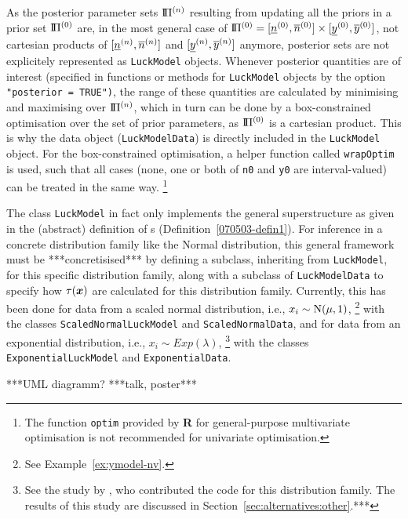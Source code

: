 As the posterior parameter sets $\text{I}\!\Pi^{(n)}$ resulting from updating all the priors in a
prior set $\text{I}\!\Pi^{(0)}$ are, in the most general case of $\text{I}\!\Pi^{(0)} = [\underline{n}^{(0)},\overline{n}^{(0)}] \times [\underline{y}^{(0)}, \overline{y}^{(0)}]$,
not cartesian products of $[\underline{n}^{(n)}, \overline{n}^{(n)}]$ and $[\underline{y}^{(n)}, \overline{y}^{(n)}]$ anymore, posterior sets are not
explicitely represented as \texttt{LuckModel} objects. Whenever posterior quantities
are of interest (specified in functions or methods for \texttt{LuckModel} objects by the option \texttt{"posterior = TRUE")},
the range of these quantities are calculated by minimising and maximising over $\text{I}\!\Pi^{(n)}$, %
which in turn can be done by a box-constrained optimisation over the set of prior parameters,
as $\text{I}\!\Pi^{(0)}$ is a cartesian product.
This is why the data object (\texttt{LuckModelData}) is directly included in the \texttt{LuckModel} object.
For the box-constrained optimisation, a helper function called \texttt{wrapOptim} is used,
such that all cases (none, one or both of \texttt{n0} and \texttt{y0} %
are interval-valued) can be treated in the same way.%
\footnote{The function \texttt{optim} provided by \textbf{R} for general-purpose
multivariate optimisation is not recommended for univariate optimisation.}

The class \texttt{LuckModel} in fact only implements the general superstructure as given in the
(abstract) definition of \model s (Definition~\ref{070503-defin1}).
For inference in a concrete distribution family like the Normal distribution,
this general framework must be ***concretisised*** %
by defining a subclass, inheriting from \texttt{LuckModel},
for this specific distribution family,
along with a subclass of \texttt{LuckModelData} to specify how $\tau({\bm x})$
are calculated for this distribution family.
Currently, this has been done for data from a scaled normal distribution,
i.e., $x_i \sim \operatorname{N}(\mu, 1)$,%
\footnote{See Example~\ref{ex:ymodel-nv}.}
with the classes \texttt{ScaledNormalLuckModel} and \texttt{ScaledNormalData},
and for data from an exponential distribution, i.e., $x_i \sim Exp(\lambda)$,%
\footnote{See the study by \textcite{2011:krautenbacher},
who contributed the code for this distribution family.
The results of this study are discussed in Section~\ref{sec:alternatives:other}.***}
with the classes \texttt{ExponentialLuckModel} and \texttt{ExponentialData}.


***UML diagramm? ***talk, poster***


